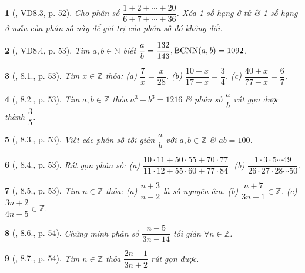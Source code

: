\documentclass{article}
\newtheorem{baitoan}{}
\begin{document}
\begin{baitoan}[\cite{TLCT_THCS_Toan_6_so_hoc}, VD8.3, p. 52]
	Cho phân số $\dfrac{1 + 2 + \cdots + 20}{6 + 7 + \cdots + 36}$. Xóa 1 số hạng ở tử \& 1 số hạng ở mẫu của phân số này để giá trị của phân số đó không đổi.
\end{baitoan}

\begin{baitoan}[\cite{TLCT_THCS_Toan_6_so_hoc}, VD8.4, p. 53]
	Tìm $a,b\in\mathbb{N}$ biết $\dfrac{a}{b} = \dfrac{132}{143},{\rm BCNN}(a,b) = 1092$.
\end{baitoan}

\begin{baitoan}[\cite{TLCT_THCS_Toan_6_so_hoc}, 8.1., p. 53]
	Tìm $x\in\mathbb{Z}$ thỏa: (a) $\dfrac{7}{x} = \dfrac{x}{28}$. (b) $\dfrac{10 + x}{17 + x} = \dfrac{3}{4}$. (c) $\dfrac{40 + x}{77 - x} = \dfrac{6}{7}$.
\end{baitoan}

\begin{baitoan}[\cite{TLCT_THCS_Toan_6_so_hoc}, 8.2., p. 53]
	Tìm $a,b\in\mathbb{Z}$ thỏa $a^3 + b^3 = 1216$ \& phân số $\dfrac{a}{b}$ rút gọn được thành $\dfrac{3}{5}$.
\end{baitoan}

\begin{baitoan}[\cite{TLCT_THCS_Toan_6_so_hoc}, 8.3., p. 53]
	Viết các phân số tối giản $\dfrac{a}{b}$  với $a,b\in\mathbb{Z}$ \& $ab = 100$.
\end{baitoan}

\begin{baitoan}[\cite{TLCT_THCS_Toan_6_so_hoc}, 8.4., p. 53]
	Rút gọn phân số: (a) $\dfrac{10\cdot11 + 50\cdot55 + 70\cdot77}{11\cdot12 + 55\cdot60 + 77\cdot84}$. (b) $\dfrac{1\cdot3\cdot5\cdots49}{26\cdot27\cdot28\cdots50}$.
\end{baitoan}

\begin{baitoan}[\cite{TLCT_THCS_Toan_6_so_hoc}, 8.5., p. 53]
	Tìm $n\in\mathbb{Z}$ thỏa: (a) $\dfrac{n + 3}{n - 2}$ là số nguyên âm. (b) $\dfrac{n + 7}{3n - 1}\in\mathbb{Z}$. (c) $\dfrac{3n + 2}{4n - 5}\in\mathbb{Z}$.
\end{baitoan}

\begin{baitoan}[\cite{TLCT_THCS_Toan_6_so_hoc}, 8.6., p. 54]
	Chứng minh phân số $\dfrac{n - 5}{3n - 14}$ tối giản $\forall n\in\mathbb{Z}$.
\end{baitoan}

\begin{baitoan}[\cite{TLCT_THCS_Toan_6_so_hoc}, 8.7., p. 54]
	Tìm $n\in\mathbb{Z}$ thỏa $\dfrac{2n - 1}{3n + 2}$ rút gọn được.
\end{baitoan}
\end{document}
